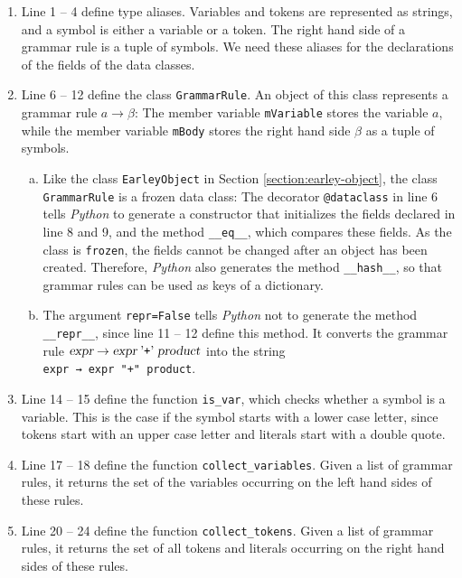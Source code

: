 \begin{enumerate}
\item Line 1 -- 4 define type aliases.  Variables and tokens are represented as strings, and a symbol is either a
      variable or a token.  The right hand side of a grammar rule is a tuple of symbols.  We need these aliases
      for the declarations of the fields of the data classes.
\item Line 6 -- 12 define the class \texttt{GrammarRule}.  An object of this class represents a grammar rule
      $a \rightarrow \beta$:  The member variable \texttt{mVariable} stores the variable $a$, while the member
      variable \texttt{mBody} stores the right hand side $\beta$ as a tuple of symbols.
      \begin{enumerate}[(a)]
      \item Like the class \texttt{EarleyObject} in Section \ref{section:earley-object}, the class
            \texttt{GrammarRule} is a frozen data class:  The decorator \texttt{@dataclass} in line 6 tells
            \textsl{Python} to generate a constructor that initializes the fields declared in line 8 and 9, and the
            method \texttt{\_\_eq\_\_}, which compares these fields.  As the class is \texttt{frozen}, the fields
            cannot be changed after an object has been created.  Therefore, \textsl{Python} also generates the
            method \texttt{\_\_hash\_\_}, so that grammar rules can be used as keys of a dictionary.
      \item The argument \texttt{repr=False} tells \textsl{Python} not to generate the method
            \texttt{\_\_repr\_\_}, since line 11 -- 12 define this method.  It converts the grammar rule
            $\textsl{expr} \rightarrow \textsl{expr} \;\mbox{'\texttt{+}'}\; \textsl{product}$ into the string
            \\[0.2cm]
            \hspace*{1.3cm}
            \texttt{expr → expr "+" product}.
      \end{enumerate}
\item Line 14 -- 15 define the function \texttt{is\_var}, which checks whether a symbol is a variable.  This is the
      case if the symbol starts with a lower case letter, since tokens start with an upper case letter and
      literals start with a double quote.
\item Line 17 -- 18 define the function \texttt{collect\_variables}.  Given a list of grammar rules, it returns the
      set of the variables occurring on the left hand sides of these rules.
\item Line 20 -- 24 define the function \texttt{collect\_tokens}.  Given a list of grammar rules, it returns the set
      of all tokens and literals occurring on the right hand sides of these rules.
\end{enumerate}

